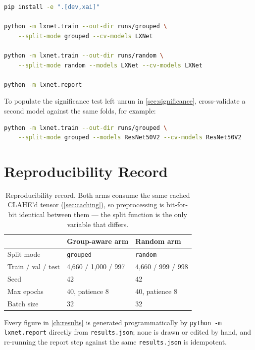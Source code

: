 \documentclass[11pt,a4paper,oneside]{report}
\newcommand{\code}[1]{\texttt{\small #1}}
\begin{document}
\begin{lstlisting}[language=bash, caption={The exact commands that produced
every table and figure in \cref{ch:results}.}, label=lst:repro]
pip install -e ".[dev,xai]"

python -m lxnet.train --out-dir runs/grouped \
    --split-mode grouped --cv-models LXNet

python -m lxnet.train --out-dir runs/random \
    --split-mode random --models LXNet --cv-models LXNet

python -m lxnet.report
\end{lstlisting}

To populate the significance test left unrun in \cref{sec:significance},
cross-validate a second model against the same folds, for example:

\begin{lstlisting}[language=bash]
python -m lxnet.train --out-dir runs/grouped \
    --split-mode grouped --models ResNet50V2 --cv-models ResNet50V2
\end{lstlisting}

\section{Reproducibility Record}
\label{sec:repro-record}

\begin{table}[h]
\centering
\small
\begin{tabular}{@{}lll@{}}
\toprule
 & \textbf{Group-aware arm} & \textbf{Random arm} \\
\midrule
Split mode & \code{grouped} & \code{random} \\
Train / val / test & 4{,}660 / 1{,}000 / 997 & 4{,}660 / 999 / 998 \\
Seed & 42 & 42 \\
Max epochs & 40, patience 8 & 40, patience 8 \\
Batch size & 32 & 32 \\
\bottomrule
\end{tabular}
\caption{Reproducibility record. Both arms consume the same cached CLAHE'd
tensor (\cref{sec:caching}), so preprocessing is bit-for-bit identical
between them --- the split function is the only variable that differs.}
\label{tab:repro-record}
\end{table}

Every figure in \cref{ch:results} is generated programmatically by
\code{python -m lxnet.report} directly from \texttt{results.json}; none is
drawn or edited by hand, and re-running the report step against the same
\texttt{results.json} is idempotent.
\end{document}

